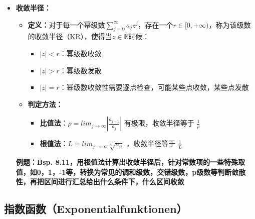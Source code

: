 \documentclass[a4paper,12pt]{article}
\begin{document}
\begin{itemize}
\item
  \textbf{收敛半径：}

  \begin{itemize}
  \item
    \textbf{定义：}对于每一个幂级数\(\sum_{j = 0}^\infty a_jz^j\)，存在一个\(r \in [0,+\infty)\)，称为该级数的收敛半径（KR），使得当\(z \in \mathbb{K}\)时候：

    \begin{itemize}
    \item
      \(|z| < r\)：幂级数收敛
    \item
      \(|z| > r\)：幂级数发散
    \item
      \(|z| = r\)：幂级数收敛性需要逐点检查，可能某些点收敛，某些点发散
    \end{itemize}
  \item
    \textbf{判定方法：}

    \begin{itemize}
    \item
      \textbf{比值法}：\(\rho = lim_{j \to \infty} |\frac{a_{j+1}}{a_j}|\)
      有极限，收敛半径等于 \(\frac{1}{\rho}\)
    \item
      \textbf{根值法}：\(L = lim_{j \to \infty}\sqrt[n]{a_n}\)
      ，收敛半径等于 \(\frac{1}{L}\)
    \end{itemize}
  \end{itemize}

  \textbf{例题：Bsp.
  8.11，用根值法计算出收敛半径后，针对常数项的一些特殊取值，如0，1，-1等，转换为常见的调和级数，交错级数，p级数等判断敛散性，再把区间进行汇总给出什么条件下，什么区间收敛}
\end{itemize}

\subsection{指数函数（Exponentialfunktionen）}\label{ux6307ux6570ux51fdux6570exponentialfunktionen}
\end{document}

